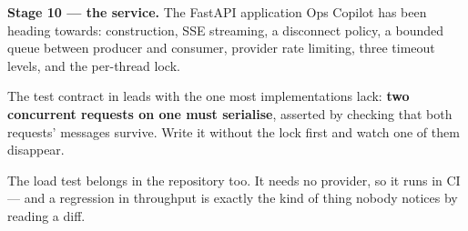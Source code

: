 \begin{projectbox}
\textbf{Stage 10 --- the service.} The FastAPI application Ops Copilot has been
heading towards:  construction, SSE streaming, a disconnect
policy, a bounded queue between producer and consumer, provider rate limiting,
three timeout levels, and the per-thread lock.

The test contract in  leads with the one most
implementations lack: \textbf{two concurrent requests on one 
must serialise}, asserted by checking that both requests' messages survive. Write
it without the lock first and watch one of them disappear.

The load test belongs in the repository too. It needs no provider, so it runs in
CI --- and a regression in throughput is exactly the kind of thing nobody notices
by reading a diff.
\end{projectbox}
